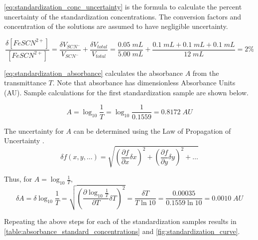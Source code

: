 \noindent
\cref{eq:standardization_conc_uncertainty} is the formula to calculate the percent uncertainty of the standardization concentrations. The conversion factors and concentration of the solutions are assumed to have negligible uncertainty.

\begin{equation}
    \frac{\delta [FeSCN^{2+}]}{[FeSCN^{2+}]} = \frac{\delta V_{SCN^-}}{V_{SCN^-}} + \frac{\delta V_{total}}{V_{total}} = \frac{0.05 \; mL}{5.00 \; mL} + \frac{0.1 \; mL + 0.1 \; mL + 0.1 \; mL}{12 \; mL} = 2\% \label{eq:standardization_conc_uncertainty}
\end{equation}

\noindent
\cref{eq:standardization_absorbance} calculates the absorbance \(A\) from the transmittance \(T\). Note that absorbance has dimensionless Absorbance Units (AU). Sample calculations for the first standardization sample are shown below.

\begin{equation}
    A = \log_{10} \frac{1}{T} = \log_{10} \frac{1}{0.1559} = 0.8172 \; AU \label{eq:standardization_absorbance}
\end{equation}

\noindent
The uncertainty for \(A\) can be determined using the Law of Propagation of Uncertainty \citep{taylor_1982}.
\begin{equation}
    \delta f(x,y,\dots)=\sqrt{\left(\frac{\partial f}{\partial x}\delta x \right)^2+ \left(\frac{\partial f}{\partial y}\delta y \right)^2+\dots} \label{eq:general_uncertainty}   
\end{equation}

\noindent
Thus, for \(A=\log_{10} \frac{1}{T}\),
\begin{equation}
    \delta A = \delta \log_{10} \frac{1}{T} = \sqrt{\left(\frac{\partial \log_{10} \frac{1}{T}}{\partial T}\delta T \right)^2} = \frac{\delta T}{T \ln 10} = \frac{0.00035}{0.1559 \ln 10} = 0.0010 \; AU 
\end{equation}

\noindent
Repeating the above steps for each of the standardization samples results in \cref{table:absorbance_standard_concentrations} and \cref{fig:standardization_curve}.

